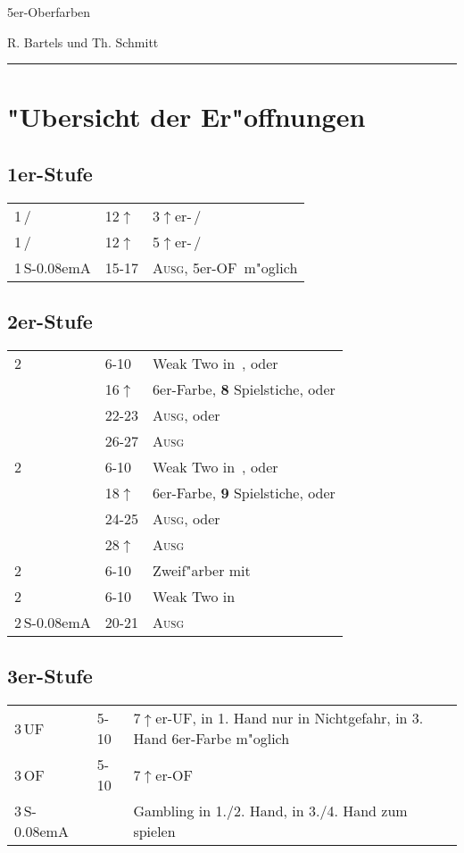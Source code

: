 \documentclass[11pt,german,twocolumn]{scrartcl}
\def\pik{\nobreak\,\Sp}
\def\coe{\nobreak\,\He}
\def\kar{\nobreak\,\Di}
\def\tre{\nobreak\,\Cl}
\def\mi{\,\Cl /\Di}
\def\ma{\,\He /\Sp}
\def\pl{$\uparrow$}
\def\uf{\nobreak\textsf{\,UF}}
\def\of{\nobreak\textsf{\,OF}}
\def\ufa{\nobreak\textsf{UF}}
\def\ofa{\nobreak\textsf{OF}}
\def\sa{\nobreak\textsf{S\kern-0.08emA}}
\def\SA{\nobreak\,\sa}
\def\bal{\textsc{Ausg}}
\newcommand\bidins[1]%
{%
\begin{flushleft}
\begin{tabularx}{\columnwidth}{llX}%
#1
\end{tabularx}%
\end{flushleft}
}
\begin{document}
\setlength{\itemsep}{0ex plus0.2ex}

\begin{center}
{\Huge 5er-Oberfarben

\huge R. Bartels und Th. Schmitt}
\end{center}
\tableofcontents

\vspace{3ex}
\hrule

\section{"Ubersicht der Er"offnungen}

\subsection*{1er-Stufe}
\bidins{%
1\mi & 12\pl	& 3\pl er-\mi\\[1ex]
1\ma & 12\pl	& 5\pl er-\ma\\[1ex]
1\SA & 15-17	& \bal, 5er-\ofa\ m"oglich
}

\subsection*{2er-Stufe}
\bidins{%
2\tre	& 6-10	& Weak Two in \kar, oder\\
	& 16\pl	& 6er-Farbe, \textbf{8} Spielstiche, oder\\
	& 22-23	& \bal, oder\\
	& 26-27	& \bal\\[1ex]
2\kar	& 6-10	& Weak Two in \coe, oder\\
	& 18\pl	& 6er-Farbe, \textbf{9} Spielstiche, oder\\
	& 24-25	& \bal, oder\\
	& 28\pl	& \bal\\[1ex]
2\coe	& 6-10	& Zweif"arber mit \coe\\[1ex]
2\pik	& 6-10	& Weak Two in \pik\\[1ex]
2\SA	& 20-21	& \bal
}

\subsection*{3er-Stufe}
\bidins{%
3\uf	& 5-10	& 7\pl{}er-\ufa, in 1. Hand nur in Nichtgefahr, in 3. Hand 6er-Farbe m"oglich\\[1ex]
3\of	& 5-10	& 7\pl{}er-\ofa\\[1ex]
3\SA	& 	& Gambling in 1./2. Hand, in 3./4. Hand zum spielen
}
\end{document}
